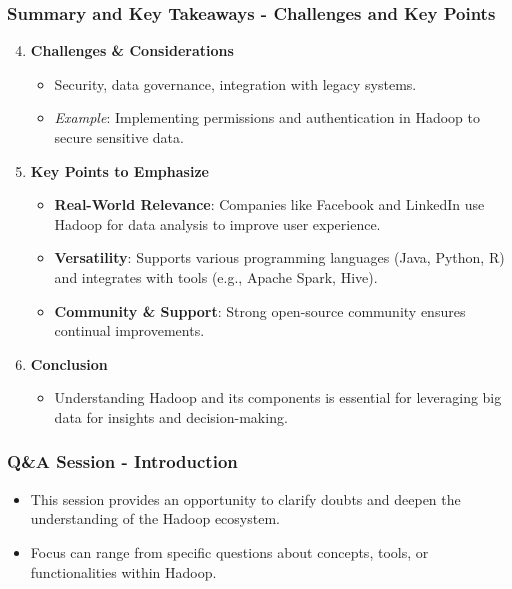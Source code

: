\documentclass[aspectratio=169]{beamer}
\begin{document}
\begin{frame}[fragile]
    \frametitle{Summary and Key Takeaways - Challenges and Key Points}

    \begin{enumerate}
        \setcounter{enumi}{3}
        \item \textbf{Challenges \& Considerations}
        \begin{itemize}
            \item Security, data governance, integration with legacy systems.
            \item \textit{Example}: Implementing permissions and authentication in Hadoop to secure sensitive data.
        \end{itemize}
        
        \item \textbf{Key Points to Emphasize}
        \begin{itemize}
            \item \textbf{Real-World Relevance}: Companies like Facebook and LinkedIn use Hadoop for data analysis to improve user experience.
            \item \textbf{Versatility}: Supports various programming languages (Java, Python, R) and integrates with tools (e.g., Apache Spark, Hive).
            \item \textbf{Community \& Support}: Strong open-source community ensures continual improvements.
        \end{itemize}
        
        \item \textbf{Conclusion}
        \begin{itemize}
            \item Understanding Hadoop and its components is essential for leveraging big data for insights and decision-making.
        \end{itemize}
    \end{enumerate}

\end{frame}

\begin{frame}[fragile]
    \frametitle{Q\&A Session - Introduction}
    \begin{itemize}
        \item This session provides an opportunity to clarify doubts and deepen the understanding of the Hadoop ecosystem.
        \item Focus can range from specific questions about concepts, tools, or functionalities within Hadoop.
    \end{itemize}
\end{frame}
\end{document}
